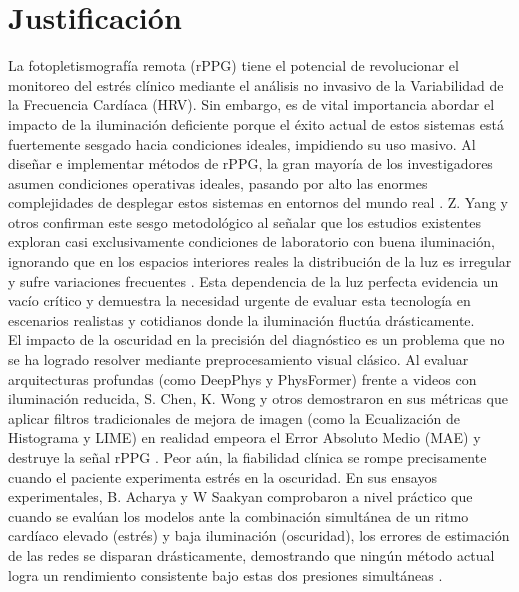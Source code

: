 \chapter{Justificación}\label{chapter:PA}

La fotopletismografía remota (rPPG) tiene el potencial de revolucionar el monitoreo del estrés clínico mediante el análisis no invasivo de la Variabilidad de la 
Frecuencia Cardíaca (HRV). Sin embargo, es de vital importancia abordar el impacto de la iluminación deficiente porque el éxito actual de estos sistemas está 
fuertemente sesgado hacia condiciones ideales, impidiendo su uso masivo. Al diseñar e implementar métodos de rPPG, la gran mayoría de los investigadores asumen 
condiciones operativas ideales, pasando por alto las enormes complejidades de desplegar estos sistemas en entornos del mundo real \cite{casado2024design}. 
Z. Yang y otros confirman este sesgo metodológico al señalar que los estudios existentes exploran casi exclusivamente condiciones de laboratorio con buena 
iluminación, ignorando que en los espacios interiores reales la distribución de la luz es irregular y sufre variaciones frecuentes \cite{yang2022assessment_dl}. 
Esta dependencia de la luz perfecta evidencia un vacío crítico y demuestra la necesidad urgente de evaluar esta tecnología en escenarios realistas y cotidianos 
donde la iluminación fluctúa drásticamente.\\

El impacto de la oscuridad en la precisión del diagnóstico es un problema que no se ha logrado resolver mediante preprocesamiento visual clásico. Al evaluar 
arquitecturas profundas (como DeepPhys y PhysFormer) frente a videos con iluminación reducida, S. Chen, K. Wong y otros demostraron en sus métricas que aplicar filtros 
tradicionales de mejora de imagen (como la Ecualización de Histograma y LIME) en realidad empeora el Error Absoluto Medio (MAE) y destruye la señal rPPG \cite{chen2024image_en}. Peor 
aún, la fiabilidad clínica se rompe precisamente cuando el paciente experimenta estrés en la oscuridad. En sus ensayos experimentales, B. Acharya y W Saakyan comprobaron 
a nivel práctico que cuando se evalúan los modelos ante la combinación simultánea de un ritmo cardíaco elevado (estrés) y baja iluminación (oscuridad), los errores 
de estimación de las redes se disparan drásticamente, demostrando que ningún método actual logra un rendimiento consistente bajo estas dos presiones simultáneas \cite{acharya2025reliability}.


